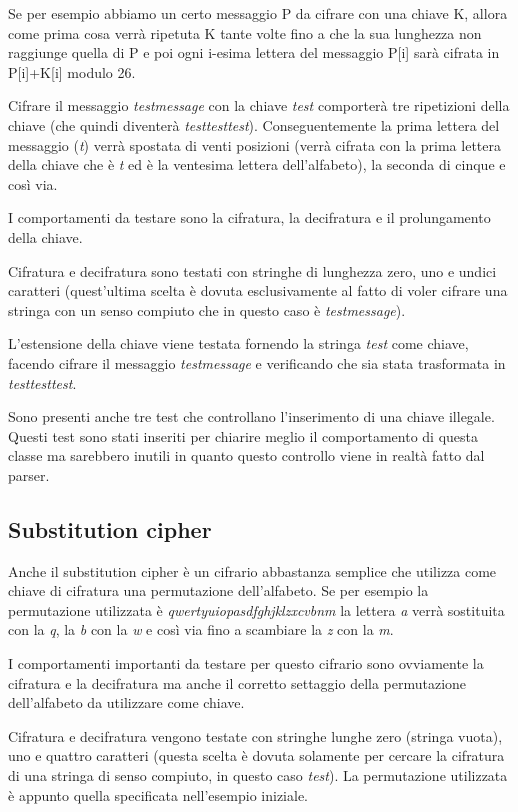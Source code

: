 			Se per esempio abbiamo un certo messaggio P da cifrare con una chiave K, allora come prima cosa verrà ripetuta K tante volte fino a che la sua lunghezza non raggiunge quella di P e poi ogni i-esima lettera del messaggio P[i] sarà cifrata in P[i]+K[i] modulo 26.
			
			Cifrare il messaggio \emph{testmessage} con la chiave \emph{test} comporterà tre ripetizioni della chiave (che quindi diventerà \emph{testtesttest}). Conseguentemente la prima lettera del messaggio (\emph{t}) verrà spostata di venti posizioni (verrà cifrata con la prima lettera della chiave che è \emph{t} ed è la ventesima lettera dell'alfabeto), la seconda di cinque e così via.
			
			I comportamenti da testare sono la cifratura, la decifratura e il prolungamento della chiave.
			
			Cifratura e decifratura sono testati con stringhe di lunghezza zero, uno e undici caratteri (quest'ultima scelta è dovuta esclusivamente al fatto di voler cifrare una stringa con un senso compiuto che in questo caso è \emph{testmessage}).
			
			L'estensione della chiave viene testata fornendo la stringa \emph{test} come chiave, facendo cifrare il messaggio \emph{testmessage} e verificando che sia stata trasformata in \emph{testtesttest}.
			
			Sono presenti anche tre test che controllano l'inserimento di una chiave illegale. Questi test sono stati inseriti per chiarire meglio il comportamento di questa classe ma sarebbero inutili in quanto questo controllo viene in realtà fatto dal parser.
			
		\subsection{Substitution cipher}
			Anche il substitution cipher è un cifrario abbastanza semplice che utilizza come chiave di cifratura una permutazione dell'alfabeto. Se per esempio la permutazione utilizzata è \emph{qwertyuiopasdfghjklzxcvbnm} la lettera \emph{a} verrà sostituita con la \emph{q}, la \emph{b} con la \emph{w} e così via fino a scambiare la \emph{z} con la \emph{m}.
			
			I comportamenti importanti da testare per questo cifrario sono ovviamente la cifratura e la decifratura ma anche il corretto settaggio della permutazione dell'alfabeto da utilizzare come chiave.
			
			Cifratura e decifratura vengono testate con stringhe lunghe zero (stringa vuota), uno e quattro caratteri (questa scelta è dovuta solamente per cercare la cifratura di una stringa di senso compiuto, in questo caso \emph{test}). La permutazione utilizzata è appunto quella specificata nell'esempio iniziale.
			
